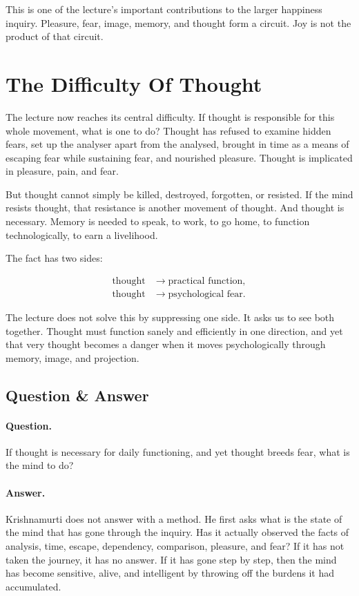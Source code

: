 This is one of the lecture's important contributions to the larger happiness inquiry. Pleasure, fear, image, memory, and thought form a circuit. Joy is not the product of that circuit.

\section{The Difficulty Of Thought}

The lecture now reaches its central difficulty. If thought is responsible for this whole movement, what is one to do? Thought has refused to examine hidden fears, set up the analyser apart from the analysed, brought in time as a means of escaping fear while sustaining fear, and nourished pleasure. Thought is implicated in pleasure, pain, and fear.

But thought cannot simply be killed, destroyed, forgotten, or resisted. If the mind resists thought, that resistance is another movement of thought. And thought is necessary. Memory is needed to speak, to work, to go home, to function technologically, to earn a livelihood.

The fact has two sides:

\begin{align}
\text{thought} &\longrightarrow \text{practical function},\\
\text{thought} &\longrightarrow \text{psychological fear}.
\end{align}

The lecture does not solve this by suppressing one side. It asks us to see both together. Thought must function sanely and efficiently in one direction, and yet that very thought becomes a danger when it moves psychologically through memory, image, and projection.

\subsection{Question \& Answer}

\paragraph{Question.} If thought is necessary for daily functioning, and yet thought breeds fear, what is the mind to do?

\paragraph{Answer.} Krishnamurti does not answer with a method. He first asks what is the state of the mind that has gone through the inquiry. Has it actually observed the facts of analysis, time, escape, dependency, comparison, pleasure, and fear? If it has not taken the journey, it has no answer. If it has gone step by step, then the mind has become sensitive, alive, and intelligent by throwing off the burdens it had accumulated.

